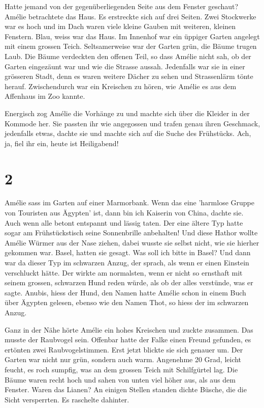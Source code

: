 \documentclass[11pt,titlepage,a5paper]{book}
\begin{document}
Hatte jemand von der gegenüberliegenden Seite aus dem Fenster geschaut? Amélie betrachtete das Haus. Es erstreckte sich auf drei Seiten. Zwei Stockwerke war es hoch und im Dach waren viele kleine Gauben mit weiteren, kleinen Fenstern. Blau, weiss war das Haus. Im Innenhof war ein üppiger Garten angelegt mit einem grossen Teich. Seltsamerweise war der Garten grün, die Bäume trugen Laub. Die Bäume verdeckten den offenen Teil, so dass Amélie nicht sah, ob der Garten eingezäunt war und wie die Strasse aussah. Jedenfalls war sie in einer grösseren Stadt, denn es waren weitere Dächer zu sehen und Strassenlärm tönte herauf. Zwischendurch war ein Kreischen zu hören, wie Amélie es aus dem Affenhaus im Zoo kannte.
 
 Energisch zog Amélie die Vorhänge zu und machte sich über die Kleider in der Kommode her. Sie passten ihr wie angegossen und trafen genau ihren Geschmack, jedenfalls etwas, dachte sie und machte sich auf die Suche des Frühstücks. Ach, ja, fiel ihr ein, heute ist Heiligabend!


\section*{2}


Amélie sass im Garten auf einer Marmorbank. Wenn das eine 'harmlose Gruppe von Touristen aus Ägypten' ist, dann bin ich Kaiserin von China, dachte sie. Auch wenn alle betont entspannt und lässig taten. Der eine ältere Typ hatte sogar am Frühstückstisch seine Sonnenbrille anbehalten! Und diese Hathor wollte Amélie Würmer aus der Nase ziehen, dabei wusste sie selbst nicht, wie sie hierher gekommen war. Basel, hatten sie gesagt. Was soll ich bitte in Basel? Und dann war da dieser Typ im schwarzen Anzug, der sprach, als wenn er einen Einstein verschluckt hätte. Der wirkte am normalsten, wenn er nicht so ernsthaft mit seinem grossen, schwarzen Hund reden würde, als ob der alles verstünde, was er sagte. Anubis, hiess der Hund, den Namen hatte Amélie schon in einem Buch über Ägypten gelesen, ebenso wie den Namen Thot, so hiess der im schwarzen Anzug.

Ganz in der Nähe hörte Amélie ein hohes Kreischen und zuckte zusammen. Das musste der Raubvogel sein. Offenbar hatte der Falke einen Freund gefunden, es ertönten zwei Raubvogelstimmen. Erst jetzt blickte sie sich genauer um. Der Garten war nicht nur grün, sondern auch warm. Angenehme 20 Grad, leicht feucht, es roch sumpfig, was an dem grossen Teich mit Schilfgürtel lag. Die Bäume waren recht hoch und sahen von unten viel höher aus, als aus dem Fenster. Waren das Lianen? An einigen Stellen standen dichte Büsche, die die Sicht versperrten. Es raschelte dahinter.
\end{document}
